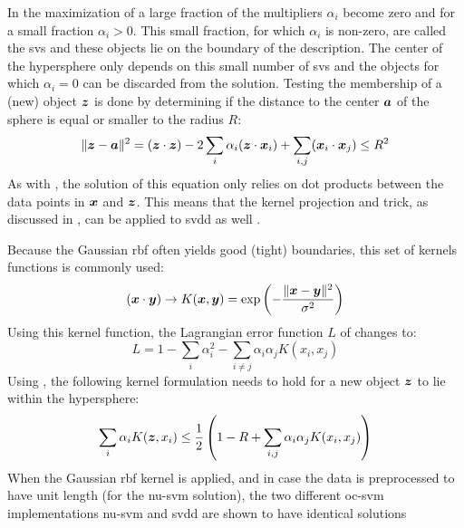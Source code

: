 In the maximization of  a large fraction of the multipliers $\alpha_i$ become zero and for a small fraction $\alpha_i > 0$.
This small fraction, for which $\alpha_i$ is non-zero, are called the \glspl{sv} and these objects lie on the boundary of the description.
The center of the hypersphere only depends on this small number of \glspl{sv} and the objects for which $\alpha_i = 0$ can be discarded from the solution.
Testing the membership of a (new) object $\vectorsym{z}$ is done by determining if the distance to the center $\vectorsym{a}$ of the sphere is equal or smaller to the radius $R$:
\begin{equation}\label{eq:svdd_test_object}
  \lVert \vectorsym{z} - \vectorsym{a} \rVert ^2 = (\vectorsym{z} \cdot \vectorsym{z}) - 2 \sum_{i} \alpha_i(\vectorsym{z} \cdot \vectorsym{x}_i) + \sum_{i,j}(\vectorsym{x}_i \cdot \vectorsym{x}_j) \le R^2
\end{equation}
As with , the solution of this equation only relies on dot products between the data points in $\vectorsym{x}$ and $\vectorsym{z}$.
This means that the kernel projection and trick, as discussed in , can be applied to \gls{svdd} as well \cite{tax1999support,tax2002uniform}.

Because the Gaussian \gls{rbf} often yields good (\ie tight) boundaries, this set of kernels functions is commonly used:
\begin{equation}
  (\vectorsym{x} \cdot \vectorsym{y}) \rightarrow K(\vectorsym{x},\vectorsym{y}) = \operatorname{exp}\left(- \frac{\lVert \vectorsym{x} - \vectorsym{y} \rVert ^2}{\sigma^2}\right)
\end{equation}
Using this kernel function, the Lagrangian error function $L$ of  changes to:
\begin{equation}\label{eq:svdd_lagrange_kernel}
  L = 1 - \sum_{i} \alpha_i^2 - \sum_{i \ne j} \alpha_i \alpha_j K(x_i, x_j)
\end{equation}
Using , the following kernel formulation needs to hold for a new object $\vectorsym{z}$ to lie within the hypersphere:
\begin{equation}\label{eq:svdd_inequality}
  \sum_{i} \alpha_i K(\vectorsym{z}, x_i) \le \frac{1}{2} \left( 1 - R + \sum_{i,j} \alpha_i \alpha_j K(x_i, x_j) \right)
\end{equation}
When the Gaussian \gls{rbf} kernel is applied, and in case the data is preprocessed to have unit length (for the \gls{nu-svm} solution), the two different \gls{oc-svm} implementations \gls{nu-svm} and \gls{svdd} are shown to have identical solutions \cite{tax2002uniform,scholkopf2002learning}

